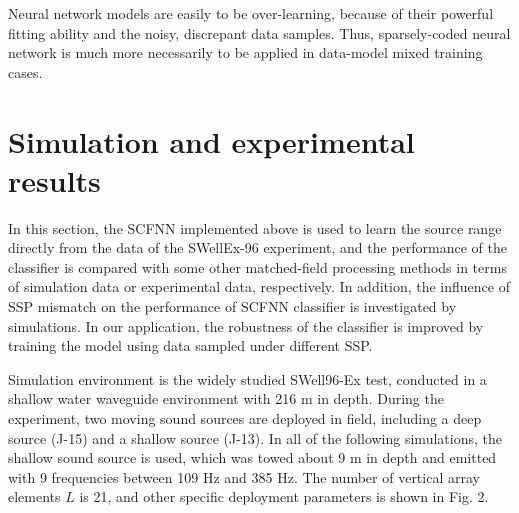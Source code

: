 Neural network models are easily to be over-learning, because of their powerful fitting ability and the noisy, discrepant data samples. Thus, sparsely-coded neural network is much more necessarily to be applied in data-model mixed training cases.

\section{Simulation and experimental results}
In this section, the SCFNN implemented above is used to learn the source range directly from the data of the SWellEx-96 experiment, and the performance of the classifier is compared with some other matched-field processing methods in terms of simulation data or experimental data, respectively. In addition, the influence of SSP mismatch on the performance of SCFNN classifier is investigated by simulations. In our application, the robustness of the classifier is improved by training the model using data sampled under different SSP.

Simulation environment is the widely studied SWell96-Ex test, conducted in a shallow water waveguide environment with 216 m in depth.
During the experiment, two moving sound sources are deployed in field, including a deep source (J-15) and a shallow source (J-13). In all of the following simulations, the shallow sound source is used, which was towed about 9 m in depth and emitted with 9 frequencies between 109 Hz and 385 Hz. The number of vertical array elements $L$ is 21, and other specific deployment parameters is shown in Fig. 2.

